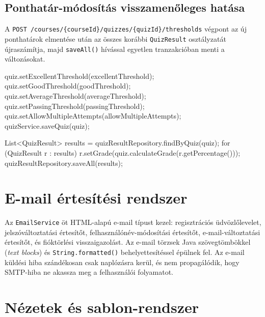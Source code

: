 \subsection{Ponthatár-módosítás visszamenőleges hatása}

A \texttt{POST /courses/\{courseId\}/quizzes/\{quizId\}/thresholds} végpont az új ponthatárok elmentése után az összes korábbi \texttt{QuizResult} osztályzatát újraszámítja, majd \texttt{saveAll()} hívással egyetlen tranzakcióban menti a változásokat.

\begin{java}[caption={Visszamenőleges osztályzat-újraszámítás ponthatár-módosítás után},label=java:threshold]
quiz.setExcellentThreshold(excellentThreshold);
quiz.setGoodThreshold(goodThreshold);
quiz.setAverageThreshold(averageThreshold);
quiz.setPassingThreshold(passingThreshold);
quiz.setAllowMultipleAttempts(allowMultipleAttempts);
quizService.saveQuiz(quiz);

List<QuizResult> results = quizResultRepository.findByQuiz(quiz);
for (QuizResult r : results) {
    r.setGrade(quiz.calculateGrade(r.getPercentage()));
}
quizResultRepository.saveAll(results);
\end{java}

\section{E-mail értesítési rendszer}

Az \texttt{EmailService} öt HTML-alapú e-mail típust kezel: regisztrációs üdvözlőlevelet, jelszóváltoztatási értesítőt, felhasználónév-módosítási értesítőt, e-mail-változtatási értesítőt, és fióktörlési visszaigazolást. Az e-mail törzsek Java szövegtömbökkel (\textit{text blocks}) és \texttt{String.formatted()} behelyettesítéssel épülnek fel. Az e-mail küldési hiba szándékosan csak naplózásra kerül, és nem propagálódik, hogy SMTP-hiba ne akassza meg a felhasználói folyamatot.

\section{Nézetek és sablon-rendszer}

